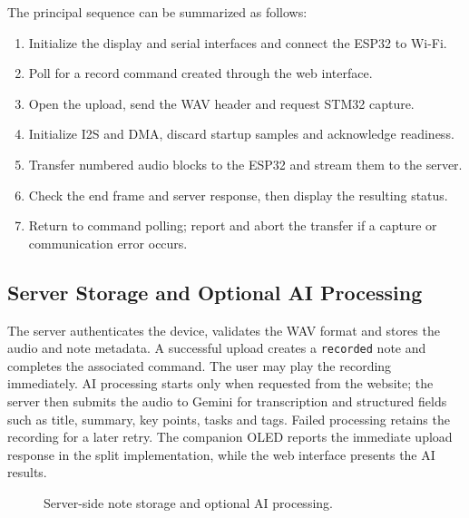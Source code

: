 The principal sequence can be summarized as follows:
\begin{enumerate}
\item Initialize the display and serial interfaces and connect the ESP32 to Wi-Fi.
\item Poll for a record command created through the web interface.
\item Open the upload, send the WAV header and request STM32 capture.
\item Initialize I2S and DMA, discard startup samples and acknowledge readiness.
\item Transfer numbered audio blocks to the ESP32 and stream them to the server.
\item Check the end frame and server response, then display the resulting status.
\item Return to command polling; report and abort the transfer if a capture or communication error occurs.
\end{enumerate}

\subsection{Server Storage and Optional AI Processing}
The server authenticates the device, validates the WAV format and stores the audio and note metadata. A successful upload creates a \texttt{recorded} note and completes the associated command. The user may play the recording immediately. AI processing starts only when requested from the website; the server then submits the audio to Gemini for transcription and structured fields such as title, summary, key points, tasks and tags. Failed processing retains the recording for a later retry. The companion OLED reports the immediate upload response in the split implementation, while the web interface presents the AI results.
\begin{figure}[htbp]
\centering
{}
\caption{Server-side note storage and optional AI processing.}
\label{fig:server-flow}
\end{figure}
